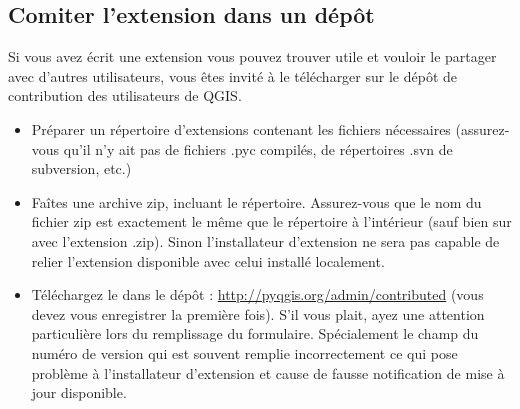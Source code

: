 \subsection{Comiter l'extension dans un dépôt}

Si vous avez écrit une extension vous pouvez trouver utile et vouloir le partager
avec d'autres utilisateurs, vous êtes invité à le télécharger sur le dépôt de
contribution des utilisateurs de QGIS.
\begin{itemize}
\item Préparer un répertoire d'extensions contenant les fichiers nécessaires
(assurez-vous qu'il n'y ait pas de fichiers .pyc compilés, de répertoires .svn
de subversion, etc.)
\item Faîtes une archive zip, incluant le répertoire. Assurez-vous que le nom du
fichier zip est exactement le même que le répertoire à l'intérieur (sauf bien
sur avec l'extension .zip). Sinon l'installateur d'extension ne sera pas capable
de relier l'extension disponible avec celui installé localement.
\item Téléchargez le dans le dépôt : \url{http://pyqgis.org/admin/contributed}
(vous devez vous enregistrer la première fois). S'il vous plait, ayez une
attention particulière lors du remplissage du formulaire. Spécialement le champ
du numéro de version qui est souvent remplie incorrectement ce qui pose
problème à l'installateur d'extension et cause de fausse notification de mise à
jour disponible.
\end{itemize}


